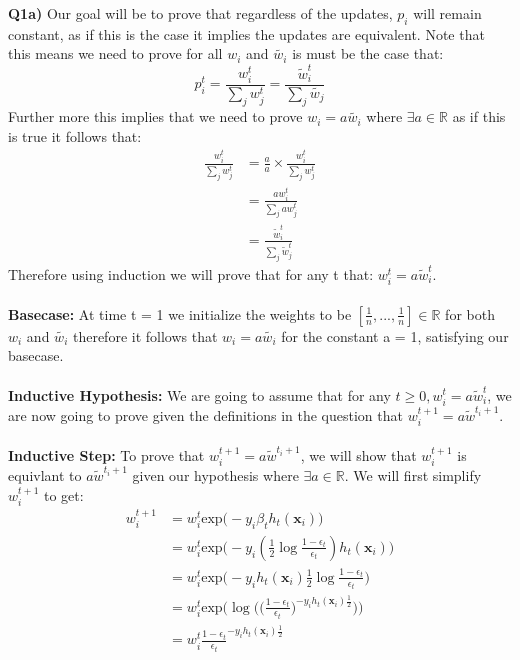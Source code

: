 \documentclass{article}
\begin{document}
\begin{titlepage}
\vspace{0.5cm}
\textbf{Q1a)} Our goal will be to prove that regardless of the updates, $p_i$ will remain constant, as if this is the case it implies the updates are equivalent. Note that this means we need to prove for all $w_i$ and $\widetilde{w_i}$ is must be the case that:
\[ p_i^t = \frac{w_i^t}{\sum_j w_j^t} = \frac{\widetilde{w}^t_i}{\sum_j \widetilde{w_j}} \]
Further more this implies that we need to prove $w_i = a\widetilde{w_i}$ where $\exists a \in \mathbb{R}$  as if this is true it follows that:
\begin{align*}
\frac{w_i^t}{\sum_j w_j^t} &= \frac{a}{a} \times \frac{w_i^t}{\sum_j w_j^t} \\
&= \frac{aw_i^t}{\sum_j aw_j^t} \\
&= \frac{\widetilde{w}_i^t}{\sum_j \widetilde{w}_j^t}
\end{align*}
Therefore using induction we will prove that for any t that: $w_i^t = a\widetilde{w}_i^t$. \\\\
\textbf{Basecase:} At time t = 1 we initialize the weights to be $[\frac{1}{n}, ..., \frac{1}{n}] \in \mathbb{R}$ for both $w_i$ and $\widetilde{w_i}$ therefore it follows that $w_i = a \widetilde{w_i}$ for the constant a = 1, satisfying our basecase.\\\\
\textbf{Inductive Hypothesis:} We are going to assume that for any $t\geq 0, w_i^t = a \widetilde{w}^t_i$, we are now going to prove given the definitions in the question that $w_i^{t+1} = a \widetilde{w}^{t_i+1}$.\\\\
\textbf{Inductive Step:} To prove that $w_i^{t+1} = a \widetilde{w}^{t_i+1}$, we will show that $w_i^{t+1}$ is equivlant to $a \widetilde{w}^{t_i+1}$ given our hypothesis where $\exists a \in \mathbb{R}$. We will first simplify $w_i^{t+1}$ to get:
\begin{align*}
w_i^{t+1} &= w_i^t \text{exp(}-y_i\beta_th_t(\textbf{x}_i)) \\
&= w_i^t \text{exp(}-y_i(\frac{1}{2}\log{\frac{1-\epsilon_t}{\epsilon_t}})  h_t(\textbf{x}_i)) \\
&= w_i^t \text{exp(}-y_ih_t(\textbf{x}_i)\frac{1}{2}\log{\frac{1-\epsilon_t}{\epsilon_t}}) \\
&= w_i^t \text{exp(}\log{((\frac{1-\epsilon_t}{\epsilon_t}})^{-y_ih_t(\textbf{x}_i)\frac{1}{2}})) \\
&= w_i^t \frac{1-\epsilon_t}{\epsilon_t}^{-y_ih_t(\textbf{x}_i)\frac{1}{2}} \\

\end{align*}
\end{titlepage}
\end{document}
